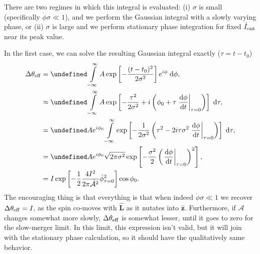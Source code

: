 \documentclass[11pt,
        usenames, %
        dvipsnames %
    ]{article}
\newcommand*{\rd}[2]{\frac{\mathrm{d}#1}{\mathrm{d}#2}}
\newcommand*{\bm}[1]{\boldsymbol{\mathbf{#1}}}
\newcommand*{\uv}[1]{\hat{\bm{#1}}}
\newcommand*{\at}[1]{\left.#1\right|}
\let\Im\undefined
\DeclareMathOperator{\Im}{Im}
\newcommand*{\p}[1]{\left(#1\right)}
\newcommand*{\s}[1]{\left[#1\right]}
\begin{document}
There are two regimes in which this integral is evaluated: (i) $\sigma$ is small
(specifically $\dot{\phi}\sigma \ll 1$), and we perform the Gaussian integral
with a slowly varying phase, or (ii) $\sigma$ is large and we perform stationary
phase integration for fixed $\dot{I}_{\rm out}$ near its peak value.

In the first case, we can solve the resulting Gaussian integral exactly ($\tau =
t - t_0$)
\begin{align}
    \Delta \theta_{\rm eff} &= \Im \int\limits_{-\infty}^\infty
            A\exp\s{-\frac{(t - t_0)^2}{2\sigma^2}} e^{i\phi}\;\mathrm{d}\phi,\\
        &\approx \Im \int\limits_{-\infty}^\infty A
            \exp\s{-\frac{\tau^2}{2\sigma^2} + i\p{\phi_0 + \tau
                \at{\rd{\phi}{t}}_{\tau = 0}}}\;\mathrm{d}\tau,\\
        &= \Im Ae^{i\phi_0} \int\limits_{-\infty}^\infty
            \exp\s{-\frac{1}{2\sigma^2}\p{\tau^2 -
                2i\tau \sigma^2\at{\rd{\phi}{t}}_{\tau = 0}}}\;\mathrm{d}\tau,\\
        &= \Im Ae^{i\phi_0}\sqrt{2\pi \sigma^2} \exp\s{
            -\frac{\sigma^2}{2} \p{\at{\rd{\phi}{t}}_{\tau = 0}}^2},\\
        &= I \exp\s{-\frac{1}{2}\frac{4I^2}{2\pi \dot{\mathcal{A}}^2}
                \dot{\phi}_{\tau = 0}^2}\cos \phi_0.
\end{align}
The encouraging thing is that everything is that when indeed $\dot{\phi} \sigma
\ll 1$ we recover $\Delta \theta_{\rm eff} = I$, as the spin co-moves with
$\uv{L}$ as it nutates into $\uv{z}$. Furthermore, if $\mathcal{A}$ changes
somewhat more slowly, $\Delta \theta_{\rm eff}$ is somewhat lesser, until it
goes to zero for the slow-merger limit. In this limit, this expression isn't
valid, but it will join with the stationary phase calculation, so it should have
the qualitatively same behavior.
\end{document}
